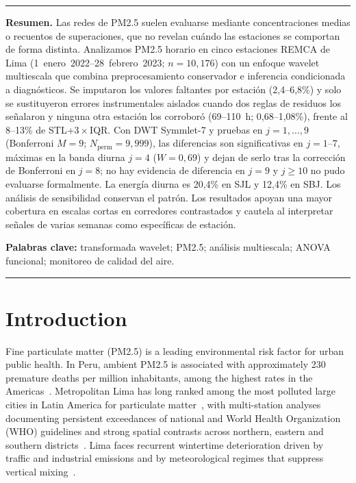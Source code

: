 \documentclass[12pt,letterpaper]{article}
\begin{document}
\vspace{0.4em}
\noindent\rule{\textwidth}{0.4pt}
\vspace{0.3em}

\noindent\textbf{Resumen.}
Las redes de PM2.5 suelen evaluarse mediante concentraciones medias o recuentos de superaciones, que no revelan cu\'ando las estaciones se comportan de forma distinta. Analizamos PM2.5 horario en cinco estaciones REMCA de Lima (1~enero~2022--28~febrero~2023; $n=10{,}176$) con un enfoque wavelet multiescala que combina preprocesamiento conservador e inferencia condicionada a diagn\'osticos. Se imputaron los valores faltantes por estaci\'on (2{,}4--6{,}8\%) y solo se sustituyeron errores instrumentales aislados cuando dos reglas de residuos los se\~nalaron y ninguna otra estaci\'on los corrobor\'o (69--110~h; 0{,}68--1{,}08\%), frente al 8--13\% de STL+$3\times$IQR. Con DWT Symmlet-7 y pruebas en $j=1,\ldots,9$ (Bonferroni $M=9$; $N_{\mathrm{perm}}=9{,}999$), las diferencias son significativas en $j=1$--$7$, m\'aximas en la banda diurna $j=4$ ($W=0{,}69$) y dejan de serlo tras la correcci\'on de Bonferroni en $j=8$; no hay evidencia de diferencia en $j=9$ y $j\ge10$ no pudo evaluarse formalmente. La energ\'ia diurna es 20{,}4\% en SJL y 12{,}4\% en SBJ. Los an\'alisis de sensibilidad conservan el patr\'on. Los resultados apoyan una mayor cobertura en escalas cortas en corredores contrastados y cautela al interpretar se\~nales de varias semanas como espec\'ificas de estaci\'on.

\medskip
\noindent\textbf{Palabras clave:}
transformada wavelet; PM2.5; an\'alisis multiescala; ANOVA funcional; monitoreo de calidad del aire.

\noindent\rule{\textwidth}{0.4pt}
\vspace{0.5em}

\section{Introduction}
\label{sec:intro}

Fine particulate matter (PM2.5) is a leading environmental risk factor for urban public health. In Peru, ambient PM2.5 is associated with approximately 230 premature deaths per million inhabitants, among the highest rates in the Americas~\cite{watts2018}. Metropolitan Lima has long ranked among the most polluted large cities in Latin America for particulate matter~\cite{iqair2023}, with multi-station analyses documenting persistent exceedances of national and World Health Organization (WHO) guidelines and strong spatial contrasts across northern, eastern and southern districts~\cite{pacsi2016,campos2024,vu2019,who2021}. Lima faces recurrent wintertime deterioration driven by traffic and industrial emissions and by meteorological regimes that suppress vertical mixing~\cite{pacsi2016,campos2024}.
\end{document}
